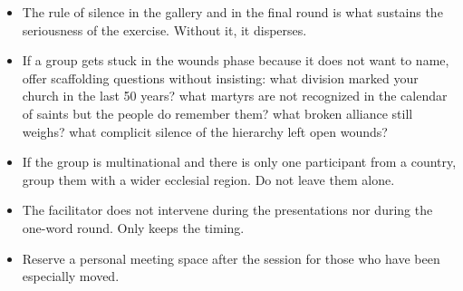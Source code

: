 \documentclass[11pt, a4paper]{article}
\begin{document}
\begin{actividad}
\begin{itemize}
  \item The rule of silence in the gallery and in the final round is what sustains the seriousness of the exercise. Without it, it disperses.
  \item If a group gets stuck in the wounds phase because it does not want to name, offer scaffolding questions without insisting: what division marked your church in the last 50 years? what martyrs are not recognized in the calendar of saints but the people do remember them? what broken alliance still weighs? what complicit silence of the hierarchy left open wounds?
  \item If the group is multinational and there is only one participant from a country, group them with a wider ecclesial region. Do not leave them alone.
  \item The facilitator does not intervene during the presentations nor during the one-word round. Only keeps the timing.
  \item Reserve a personal meeting space after the session for those who have been especially moved.
\end{itemize}

\end{actividad}

\newpage
\end{document}

